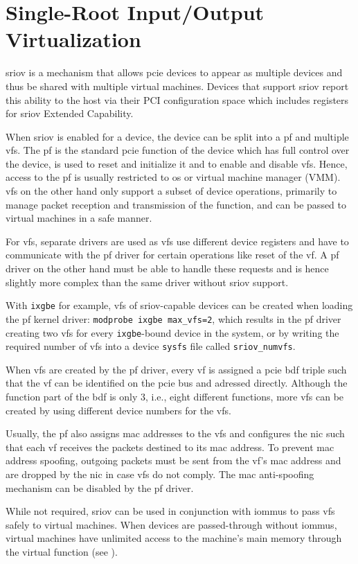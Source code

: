 \section{Single-Root Input/Output Virtualization}
\label{sec:sriov}

\Acf{sriov} is a mechanism that allows \ac{pcie} devices to appear as multiple
devices and thus be shared with multiple virtual machines. Devices that support
\ac{sriov} report this ability to the host via their PCI configuration space
which includes registers for \ac{sriov} Extended Capability.

When \ac{sriov} is enabled for a device, the device can be split into a \ac{pf}
and multiple \acp{vf}. The \ac{pf} is the standard \ac{pcie} function of the
device which has full control over the device, is used to reset and initialize
it and to enable and disable \acp{vf}. Hence, access to the \ac{pf} is usually
restricted to \ac{os} or virtual machine manager (VMM). \acp{vf} on the other
hand only support a subset of device operations, primarily to manage packet
reception and transmission of the function, and can be passed to virtual
machines in a safe manner.

For \acp{vf}, separate drivers are used as \acp{vf} use different device
registers and have to communicate with the \ac{pf} driver for certain operations
like reset of the \ac{vf}. A \ac{pf} driver on the other hand must be able to
handle these requests and is hence slightly more complex than the same driver
without \ac{sriov} support.

With \texttt{ixgbe} for example, \acp{vf} of \ac{sriov}-capable devices can be
created when loading the \ac{pf} kernel driver: \texttt{modprobe ixgbe
max\_vfs=2}, which results in the \ac{pf} driver creating two \acp{vf} for every
\texttt{ixgbe}-bound device in the system, or by writing the required number of
\acp{vf} into a device \texttt{sysfs} file called \texttt{sriov\_numvfs}.

When \acp{vf} are created by the \ac{pf} driver, every \ac{vf} is assigned a
\ac{pcie} \ac{bdf} triple such that the \ac{vf} can be identified on the
\ac{pcie} bus and adressed directly. Although the function part of the \ac{bdf}
is only \SI{3}{\bit}, i.e., eight different functions, more \acp{vf} can be
created by using different device numbers for the \acp{vf}.

Usually, the \ac{pf} also assigns \ac{mac} addresses to the \acp{vf} and
configures the \ac{nic} such that each \ac{vf} receives the packets destined to
its \ac{mac} address. To prevent \ac{mac} address spoofing, outgoing packets
must be sent from the \ac{vf}'s \ac{mac} address and are dropped by the \ac{nic}
in case \acp{vf} do not comply. The \ac{mac} anti-spoofing mechanism can be
disabled by the \ac{pf} driver.

While not required, \ac{sriov} can be used in conjunction with \acp{iommu} to
pass \acp{vf} safely to virtual machines. When devices are passed-through
without \acp{iommu}, virtual machines have unlimited access to the machine's
main memory through the virtual function (see ).

